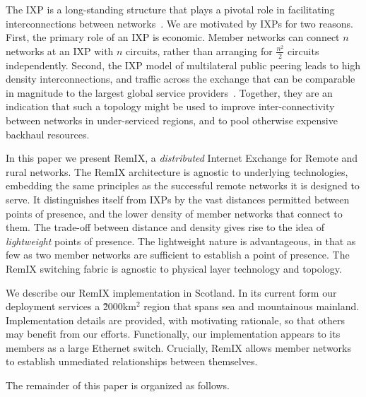 The \acf{IXP} is a long-standing structure that plays a pivotal role in
facilitating interconnections between networks~\cite{Ager:2012}. We are
motivated by \acp{IXP} for two reasons. First, the primary role of an \ac{IXP}
is economic. Member networks can connect $n$ networks at an IXP with $n$
circuits, rather than arranging for $\frac{n^2}{2}$ circuits independently.
Second, the \ac{IXP} model of multilateral public peering leads to high density
interconnections, and traffic across the exchange that can be comparable in
magnitude to the largest global service providers~\cite{Ager:2012}. Together,
they are an indication that such a topology might be used to improve
inter-connectivity between networks in under-serviced regions, and to pool
otherwise expensive backhaul resources.

In this paper we present RemIX, a \emph{distributed} Internet Exchange for
Remote and rural networks. The RemIX architecture is agnostic to underlying
technologies, embedding the same principles as the successful remote networks it
is designed to serve. It distinguishes itself from \acp{IXP} by the vast
distances permitted between points of presence, and the lower density of member
networks that connect to them. The trade-off between distance and density gives
rise to the idea of \emph{lightweight} points of presence. The lightweight
nature is advantageous, in that as few as two member networks are sufficient to
establish a point of presence. The RemIX switching fabric is agnostic to
physical layer technology and topology.

We describe our RemIX implementation in Scotland. In its current form our
deployment services a \~2000km$^2$ region that spans sea and mountainous
mainland. Implementation details are provided, with motivating rationale, so
that others may benefit from our efforts. Functionally, our implementation
appears to its members as a large Ethernet switch. Crucially, RemIX allows
member networks to establish unmediated relationships between themselves.

The remainder of this paper is organized as follows. 
